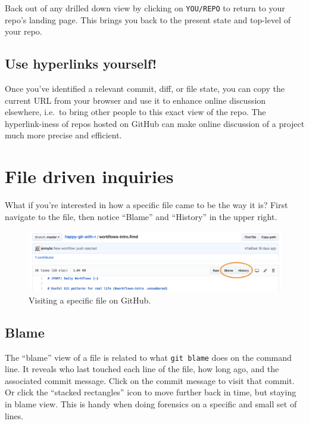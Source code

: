 \documentclass[
]{book}
\begin{document}
Back out of any drilled down view by clicking on \texttt{YOU/REPO} to return to your repo's landing page. This brings you back to the present state and top-level of your repo.

\subsection{Use hyperlinks yourself!}\label{use-hyperlinks-yourself}

Once you've identified a relevant commit, diff, or file state, you can copy the current URL from your browser and use it to enhance online discussion elsewhere, i.e.~to bring other people to this exact view of the repo. The hyperlink-iness of repos hosted on GitHub can make online discussion of a project much more precise and efficient.

\section{File driven inquiries}\label{file-driven-inquiries}

What if you're interested in how a specific file came to be the way it is? First navigate to the file, then notice ``Blame'' and ``History'' in the upper right.

\begin{figure}
\includegraphics[width=1\linewidth]{img/screenshots/github-specific-file} \caption{Visiting a specific file on GitHub.}\label{fig:github-specific-file}
\end{figure}

\subsection{Blame}\label{blame}

The ``blame'' view of a file is related to what \texttt{git\ blame} does on the command line. It reveals who last touched each line of the file, how long ago, and the associated commit message. Click on the commit message to visit that commit. Or click the ``stacked rectangles'' icon to move further back in time, but staying in blame view. This is handy when doing forensics on a specific and small set of lines.
\end{document}
